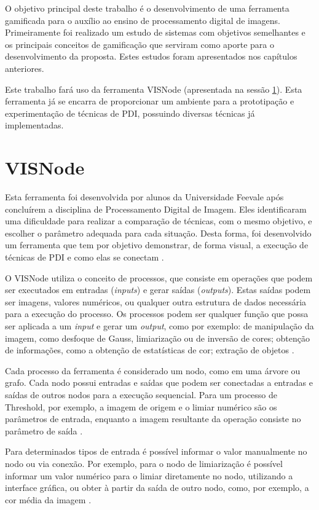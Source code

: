 \documentclass[
	12pt,				%
	oneside,			%
	a4paper,			%
	english,			%
	french,				%
	spanish,			%
	brazil,				%
	]{abntex2}
\begin{document}
O objetivo principal deste trabalho é o desenvolvimento de uma ferramenta gamificada para o auxílio ao ensino de processamento digital de imagens. Primeiramente foi realizado um estudo de sistemas com objetivos semelhantes e os principais conceitos de gamificação que serviram como aporte para o desenvolvimento da proposta. Estes estudos foram apresentados nos capítulos anteriores.
    
Este trabalho fará uso da ferramenta VISNode (apresentada na sessão \ref{sec:visnode}). Esta ferramenta já se encarra de proporcionar um ambiente para a prototipação e experimentação de técnicas de PDI, possuindo diversas técnicas já implementadas. 
   
\section{VISNode}
\label{sec:visnode}

Esta ferramenta foi desenvolvida por alunos da Universidade Feevale após concluírem a disciplina de Processamento Digital de Imagem. Eles identificaram uma dificuldade para realizar a comparação de técnicas, com o mesmo objetivo, e escolher o parâmetro adequada para cada situação. Desta forma, foi desenvolvido um ferramenta que tem por objetivo demonstrar, de forma visual,  a execução de técnicas de PDI e como elas se conectam \cite{visnode}.

O VISNode utiliza o conceito de processos, que consiste em operações que podem ser executados em entradas (\textit{inputs}) e gerar saídas (\textit{outputs}). Estas saídas podem ser imagens, valores numéricos, ou qualquer outra estrutura de dados necessária para a execução do processo. Os processos podem ser qualquer função que possa ser aplicada a um \textit{input} e gerar um \textit{output}, como por exemplo: de manipulação da imagem, como desfoque de Gauss, limiarização ou de inversão de cores; obtenção de informações, como a obtenção de estatísticas de cor;  extração de objetos \cite{visnode}.

Cada processo da ferramenta é considerado um nodo, como em uma árvore ou grafo. Cada nodo possui entradas e saídas que podem ser conectadas a entradas e saídas de outros nodos para a execução sequencial. Para um processo de Threshold, por exemplo, a imagem de origem e o limiar numérico são os parâmetros de entrada, enquanto a imagem resultante da operação consiste no parâmetro de saída \cite{visnode}. 

Para determinados tipos de entrada é possível informar o valor manualmente no nodo ou via conexão. Por exemplo, para o nodo de limiarização é possível informar um valor numérico para o limiar diretamente no nodo, utilizando a interface gráfica, ou obter à partir da saída de outro nodo, como, por exemplo, a cor média da imagem \cite{visnode}.
\end{document}
